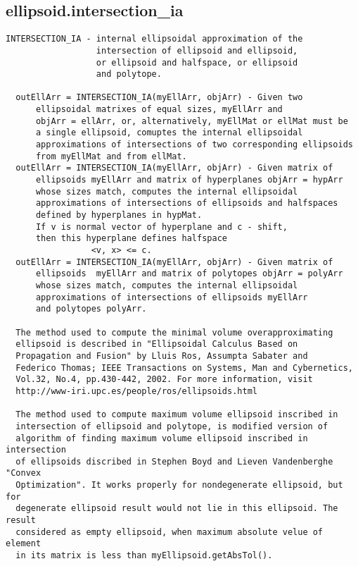 \subsection{\texorpdfstring{ellipsoid.intersection\_ia}{intersection\_ia}}\label{method:ellipsoid.intersectionia}
\begin{verbatim}
INTERSECTION_IA - internal ellipsoidal approximation of the
                  intersection of ellipsoid and ellipsoid,
                  or ellipsoid and halfspace, or ellipsoid
                  and polytope.

  outEllArr = INTERSECTION_IA(myEllArr, objArr) - Given two
      ellipsoidal matrixes of equal sizes, myEllArr and
      objArr = ellArr, or, alternatively, myEllMat or ellMat must be
      a single ellipsoid, comuptes the internal ellipsoidal
      approximations of intersections of two corresponding ellipsoids
      from myEllMat and from ellMat.
  outEllArr = INTERSECTION_IA(myEllArr, objArr) - Given matrix of
      ellipsoids myEllArr and matrix of hyperplanes objArr = hypArr
      whose sizes match, computes the internal ellipsoidal
      approximations of intersections of ellipsoids and halfspaces
      defined by hyperplanes in hypMat.
      If v is normal vector of hyperplane and c - shift,
      then this hyperplane defines halfspace
                 <v, x> <= c.
  outEllArr = INTERSECTION_IA(myEllArr, objArr) - Given matrix of
      ellipsoids  myEllArr and matrix of polytopes objArr = polyArr
      whose sizes match, computes the internal ellipsoidal
      approximations of intersections of ellipsoids myEllArr
      and polytopes polyArr.

  The method used to compute the minimal volume overapproximating
  ellipsoid is described in "Ellipsoidal Calculus Based on
  Propagation and Fusion" by Lluis Ros, Assumpta Sabater and
  Federico Thomas; IEEE Transactions on Systems, Man and Cybernetics,
  Vol.32, No.4, pp.430-442, 2002. For more information, visit
  http://www-iri.upc.es/people/ros/ellipsoids.html

  The method used to compute maximum volume ellipsoid inscribed in
  intersection of ellipsoid and polytope, is modified version of
  algorithm of finding maximum volume ellipsoid inscribed in intersection
  of ellipsoids discribed in Stephen Boyd and Lieven Vandenberghe "Convex
  Optimization". It works properly for nondegenerate ellipsoid, but for
  degenerate ellipsoid result would not lie in this ellipsoid. The result
  considered as empty ellipsoid, when maximum absolute velue of element
  in its matrix is less than myEllipsoid.getAbsTol().


\end{verbatim}
